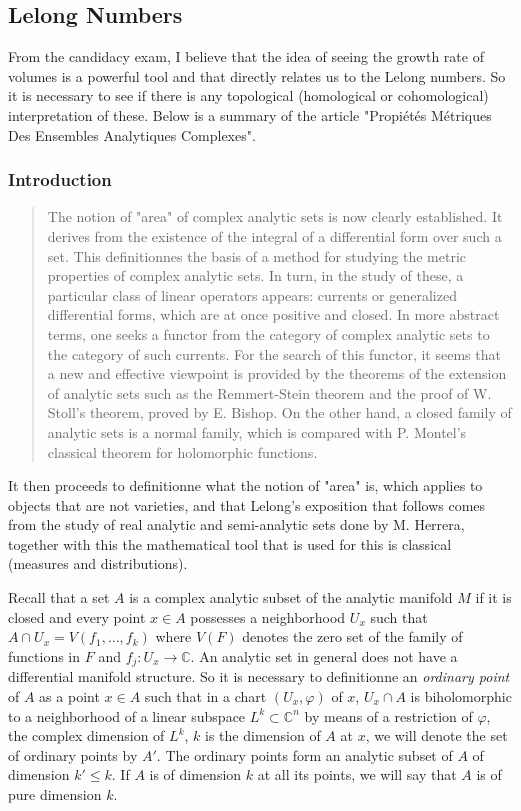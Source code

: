 \documentclass[12pt,twoside,a4paper]{report}
\begin{document}
\subsection{Lelong Numbers}
\noindent From the candidacy exam, I believe that the idea of seeing the growth rate of volumes is a powerful tool and that directly relates us to the Lelong numbers. So it is necessary to see if there is any topological (homological or cohomological) interpretation of these. Below is a summary of the article "Propiétés Métriques Des Ensembles Analytiques Complexes".
\subsubsection{Introduction}
\begin{quote}
The notion of "area" of complex analytic sets is now clearly established. It derives from the existence of the integral of a differential form over such a set. This definitionnes the basis of a method for studying the metric properties of complex analytic sets. In turn, in the study of these, a particular class of linear operators appears: currents or generalized differential forms, which are at once positive and closed. In more abstract terms, one seeks a functor from the category of complex analytic sets to the category of such currents. For the search of this functor, it seems that a new and effective viewpoint is provided by the theorems of the extension of analytic sets such as the Remmert-Stein theorem and the proof of W. Stoll's theorem, proved by E. Bishop. On the other hand, a closed family of analytic sets is a normal family, which is compared with P. Montel's classical theorem for holomorphic functions.
\end{quote}

\noindent It then proceeds to definitionne what the notion of "area" is, which applies to objects that are not varieties, and that Lelong's exposition that follows comes from the study of real analytic and semi-analytic sets done by M. Herrera, together with this the mathematical tool that is used for this is classical (measures and distributions).

Recall that a set $A$ is a complex analytic subset of the analytic manifold $M$ if it is closed and every point $x\in A$ possesses a neighborhood $U_x$ such that $A\cap U_x=V(f_1,\dots,f_k)$ where $V(F)$ denotes the zero set of the family of functions in $F$ and $f_j:U_x\rightarrow\mathbb{C}$. An analytic set in general does not have a differential manifold structure. So it is necessary to definitionne an \emph{ordinary point} of $A$ as a point $x\in A$ such that in a chart $(U_x,\varphi)$ of $x$, $U_x\cap A$ is biholomorphic to a neighborhood of a linear subspace $L^{k}\subset\mathbb{C}^n$ by means of a restriction of $\varphi$, the complex dimension of $L^{k}$, $k$ is the dimension of $A$ at $x$, we will denote the set of ordinary points by $A'$. The ordinary points form an analytic subset of $A$ of dimension $k'\leq k$. If $A$ is of dimension $k$ at all its points, we will say that $A$ is of pure dimension $k$.
\end{document}
